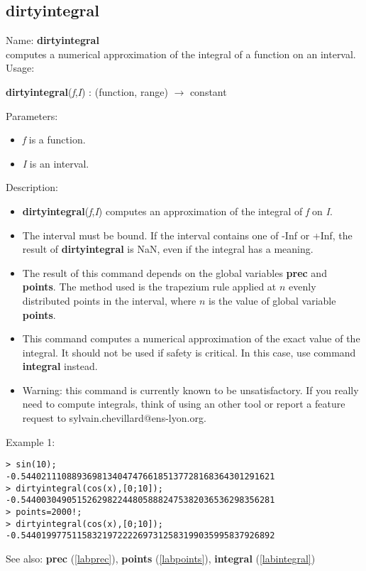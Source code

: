 \subsection{dirtyintegral}
\label{labdirtyintegral}
\noindent Name: \textbf{dirtyintegral}\\
computes a numerical approximation of the integral of a function on an interval.\\
\noindent Usage: 
\begin{center}
\textbf{dirtyintegral}(\emph{f},\emph{I}) : (\textsf{function}, \textsf{range}) $\rightarrow$ \textsf{constant}
\\ 
\end{center}
Parameters: 
\begin{itemize}
\item \emph{f} is a function.
\item \emph{I} is an interval.
\end{itemize}
\noindent Description: \begin{itemize}

\item \textbf{dirtyintegral}(\emph{f},\emph{I}) computes an approximation of the integral of \emph{f} on \emph{I}.

\item The interval must be bound. If the interval contains one of -Inf or +Inf, the 
   result of \textbf{dirtyintegral} is NaN, even if the integral has a meaning.

\item The result of this command depends on the global variables \textbf{prec} and \textbf{points}.
   The method used is the trapezium rule applied at $n$ evenly distributed
   points in the interval, where $n$ is the value of global variable \textbf{points}.

\item This command computes a numerical approximation of the exact value of the 
   integral. It should not be used if safety is critical. In this case, use
   command \textbf{integral} instead.

\item Warning: this command is currently known to be unsatisfactory. If you really
   need to compute integrals, think of using an other tool or report a feature
   request to sylvain.chevillard@ens-lyon.org.
\end{itemize}
\noindent Example 1: 
\begin{center}\begin{minipage}{15cm}\begin{Verbatim}[frame=single]
> sin(10);
-0.54402111088936981340474766185137728168364301291621
> dirtyintegral(cos(x),[0;10]);
-0.54400304905152629822448058882475382036536298356281
> points=2000!;
> dirtyintegral(cos(x),[0;10]);
-0.54401997751158321972222697312583199035995837926892
\end{Verbatim}
\end{minipage}\end{center}
See also: \textbf{prec} (\ref{labprec}), \textbf{points} (\ref{labpoints}), \textbf{integral} (\ref{labintegral})
